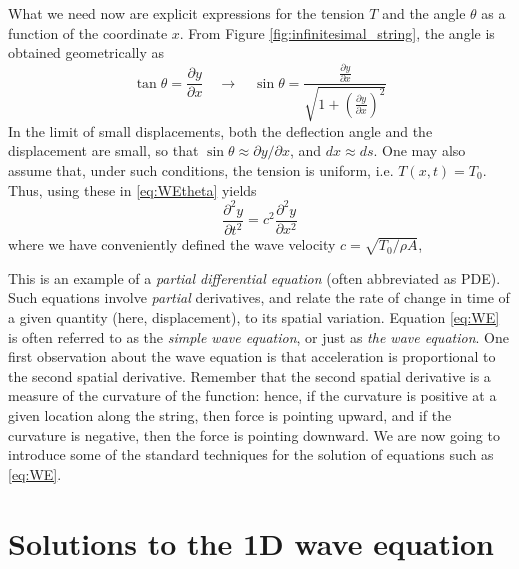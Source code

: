 \documentclass[11pt,twoside,a4paper,english]{book}
\begin{document}
What we need now are explicit expressions for the tension $T$ and the angle $\theta$ as a function of the  coordinate $x$. From Figure \ref{fig:infinitesimal_string}, the angle is obtained geometrically as
\begin{equation}
\tan\theta = \frac{\partial y}{\partial x} \quad \rightarrow \quad \sin\theta = \frac{\frac{\partial y}{\partial x}}{\sqrt{1 + (\frac{\partial y}{\partial x})^2}} 
\end{equation}
In the limit of small displacements, both the deflection angle and the displacement are small, so that $\sin \theta  \approx \partial y / \partial x$, and $dx \approx ds$. One may also assume that, under such conditions, the tension is uniform, i.e. $T(x,t)=T_0$. Thus, using these in \eqref{eq:WEtheta} yields
\begin{equation}\label{eq:WE}
 \frac{\partial^2 y}{\partial t^2} = c^2 \frac{\partial^2 y}{\partial x^2}
\end{equation}
where we have conveniently defined the wave velocity $c = \sqrt{T_0 /\rho A}$,





This is an example of a \emph{partial differential equation} (often abbreviated as PDE). Such equations involve \emph{partial} derivatives, and relate the rate of change in time of a given quantity (here, displacement), to its spatial variation. Equation \eqref{eq:WE} is often referred to as the \emph{simple wave equation}, or just as \emph{the wave equation}.
One first observation about the wave equation is that acceleration is proportional to the second spatial derivative. Remember that the second spatial derivative is a measure of the curvature of the function: hence, if the curvature is positive at a given location along the string, then force is pointing upward, and if the curvature is negative, then the force is pointing downward.  We are now going to introduce some of the standard techniques for the solution of equations such as \eqref{eq:WE}. 




\section{Solutions to the 1D wave equation}
\end{document}
